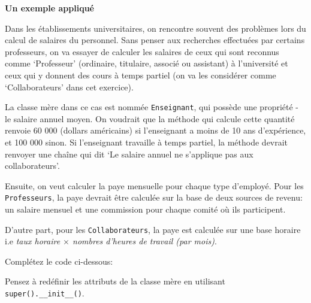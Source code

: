 \begin{Exercice}[15 minutes]\textbf{Un exemple appliqué}

Dans les établissements universitaires, on rencontre souvent des problèmes lors du calcul de salaires du personnel. Sans penser aux recherches effectuées par certains professeurs, on va essayer de calculer les salaires de ceux qui sont reconnus comme `Professeur' (ordinaire, titulaire, associé ou assistant) à l'université et ceux qui y donnent des cours à temps partiel (on va les considérer comme `Collaborateurs' dans cet exercice).

La classe mère dans ce cas est nommée \lstinline{Enseignant}, qui possède une propriété - le salaire annuel moyen. On voudrait que la méthode qui calcule cette quantité renvoie 60 000 (dollars américains) si l'enseignant a moins de 10 ans d'expérience, et 100 000 sinon. Si l'enseignant travaille à temps partiel, la méthode devrait renvoyer une chaîne qui dit `Le salaire annuel ne s'applique pas aux collaborateurs'.

Ensuite, on veut calculer la paye mensuelle pour chaque type d'employé. Pour les \lstinline{Professeurs}, la paye devrait être calculée sur la base de deux sources de revenu: un salaire mensuel et une commission pour chaque comité où ils participent. 

D'autre part, pour les \lstinline{Collaborateurs}, la paye est calculée sur une base horaire i.e \textit{taux horaire $\times$ nombres d'heures de travail (par mois)}.


Complétez le code ci-dessous:

 

\begin{conseil}
Pensez à redéfinir les attributs de la classe mère en utilisant \lstinline{super().__init__()}.
\end{conseil}

\begin{solution}
 
\end{solution}
\end{Exercice}


